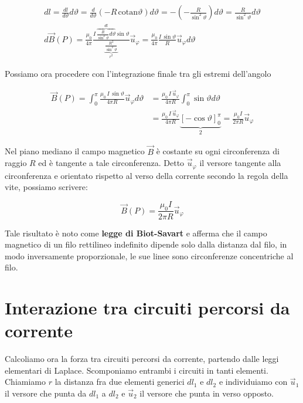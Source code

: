 \begin{gather*}
	dl=\frac{dl}{d\vartheta}d\vartheta =\frac{d}{d\vartheta}(-R\,\text{cotan}\vartheta  )d\vartheta = -\left( -\frac{R}{\sin^2 \vartheta} \right) d\vartheta = \frac{R}{\sin^2 \vartheta} d\vartheta \\
	d\vec{B} (P)= \frac{\mu_0}{4\pi}\frac{I\, \overbrace{\frac{R}{\sin^2 \vartheta}d\vartheta}^{dl} \sin \vartheta}{\underbrace{\frac{R^2}{\sin^2 \vartheta}}_{r^2}}\vec{u}_{\varphi} = \frac{\mu_0}{4\pi}\frac{I\,\sin \vartheta}{R}\vec{u}_{\varphi}d\vartheta
\end{gather*}

Possiamo ora procedere con l'integrazione finale tra gli estremi dell'angolo

\begin{equation*}
	\begin{aligned}
		\vec{B} (P)= \int_0^{\pi} \frac{\mu_0 \,I\,\sin \vartheta}{4\pi R}\vec{u}_{\varphi}d\vartheta &= \frac{\mu_0 \,I\,\vec{u}_{\varphi}}{4\pi R}\int_0^{\pi} \sin \vartheta d\vartheta \\
		&= \frac{\mu_0 \,I\,\vec{u}_{\varphi}}{4\pi R} \underbrace{[-\cos \vartheta ]_0^{\pi}}_2 = \frac{\mu_0 I}{2\pi R}\vec{u}_{\varphi}
	\end{aligned}
\end{equation*}

Nel piano mediano il campo magnetico $\vec{B}$ è costante su ogni circonferenza di raggio $R$ ed è tangente a tale circonferenza. Detto $ \vec{u}_{\varphi} $ il versore tangente alla circonferenza e orientato rispetto al verso della corrente secondo la regola della vite, possiamo scrivere:

\[
	\vec{B} (P)=\frac{\mu_0 I}{2\pi R}\vec{u}_{\varphi}
\]

Tale risultato è noto come \textbf{legge di Biot-Savart} e afferma che il campo magnetico di un filo rettilineo indefinito dipende solo dalla distanza dal filo, in modo inversamente proporzionale, le sue linee sono circonferenze concentriche al filo.

\section{Interazione tra circuiti percorsi da corrente}

Calcoliamo ora la forza tra circuiti percorsi da corrente, partendo dalle leggi elementari di Laplace. Scomponiamo entrambi i circuiti in tanti elementi. Chiamiamo $r$ la distanza fra due elementi generici $dl_1$ e $dl_2$ e individuiamo con $\vec{u}_1$ il versore che punta da $dl_1$ a $dl_2$ e $\vec{u}_2$ il versore che punta in verso opposto.

